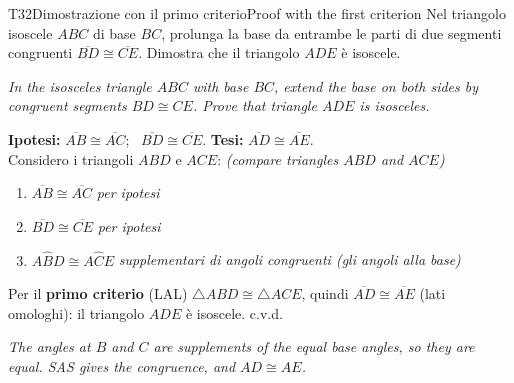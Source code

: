 \documentclass[11pt,a4paper]{article}
\newcommand{\en}[1]{\par{\small\itshape\color{engray}#1\par}}
\newcommand{\enx}[1]{{\small\itshape\color{engray}(#1)}}
\newcommand{\ang}[3]{#1\widehat{#2}#3}
\newcommand{\seg}[1]{\overline{#1}}
\newcommand{\tri}[1]{\triangle #1}
\begin{document}
\begin{solbox}
\begin{center}
\end{center}
\end{solbox}

\begin{esercizio}{T3}{2}{Dimostrazione con il primo criterio}{Proof with the first criterion}
Nel triangolo isoscele $ABC$ di base $BC$, prolunga la base da entrambe le parti di due segmenti congruenti $\seg{BD}\cong\seg{CE}$. Dimostra che il triangolo $ADE$ è isoscele.
\en{In the isosceles triangle $ABC$ with base $BC$, extend the base on both sides by congruent segments $BD \cong CE$. Prove that triangle $ADE$ is isosceles.}
\begin{center}
\end{center}
\end{esercizio}
\begin{solbox}
\textbf{Ipotesi:} $\seg{AB}\cong\seg{AC}$; \ $\seg{BD}\cong\seg{CE}$. \qquad \textbf{Tesi:} $\seg{AD}\cong\seg{AE}$.\\
Considero i triangoli $ABD$ e $ACE$: \enx{compare triangles $ABD$ and $ACE$}
\begin{enumerate}[label=\arabic*.]
\item $\seg{AB}\cong\seg{AC}$ \hfill {\small\itshape per ipotesi}
\item $\seg{BD}\cong\seg{CE}$ \hfill {\small\itshape per ipotesi}
\item $\ang{A}{B}{D}\cong\ang{A}{C}{E}$ \hfill {\small\itshape supplementari di angoli congruenti (gli angoli alla base)}
\end{enumerate}
Per il \textbf{primo criterio} (LAL) $\tri{ABD}\cong\tri{ACE}$, quindi $\seg{AD}\cong\seg{AE}$ (lati omologhi): il triangolo $ADE$ è isoscele. \hfill c.v.d.
\en{The angles at $B$ and $C$ are supplements of the equal base angles, so they are equal. SAS gives the congruence, and $AD \cong AE$.}
\end{solbox}
\end{document}
